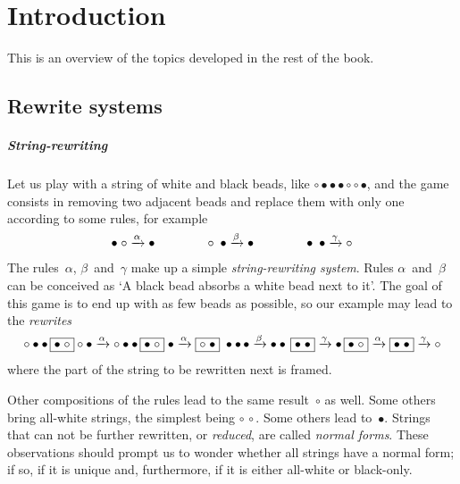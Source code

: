\chapter{Introduction}
\setcounter{page}{1}

This is an overview of the topics developed in the rest of the book.

\section{Rewrite systems}

\paragraph{String-rewriting}

Let us play with a string of white and black beads, like \(\circ
\bullet \bullet \bullet \circ \circ \bullet\), and the game
\citep{VanLeeuwen_1990a,Dershowitz_1993} consists in removing two
adjacent beads and replace them with only one according to some rules,
for example
\begin{equation*}
\bullet \; \circ   \xrightarrow{\smash{\alpha}} \bullet\qquad\qquad
\circ   \; \bullet \xrightarrow{\smash{\beta}} \bullet\qquad\qquad
\bullet \; \bullet \xrightarrow{\smash{\gamma}} \circ
\end{equation*}
The rules~\(\alpha\), \(\beta\)~and~\(\gamma\) make up a simple
\emph{string\hyp{}rewriting system}. Rules
\(\alpha\)~and~\(\beta\) can be conceived as `A black bead absorbs
a white bead next to it'. The goal of this game is to end up with
as few beads as possible, so our example may lead to the
\emph{rewrites}
\begin{equation*}
\circ \bullet \bullet \, \fbox{\(\bullet\; \circ\)} \circ \bullet
\xrightarrow{\smash{\alpha}} \circ \bullet \bullet \,
\fbox{\(\bullet\; \circ\)} \; \bullet \xrightarrow{\smash{\alpha}}
\fbox{\(\circ \; \bullet\)} \; \bullet \bullet \,\bullet
\xrightarrow{\smash{\beta}} \bullet \bullet \, \fbox{\(\bullet \;
  \bullet\)} \xrightarrow{\smash{\gamma}} \bullet \, \fbox{\(\bullet
  \; \circ\)} \xrightarrow{\smash{\alpha}} \fbox{\(\bullet \;
  \bullet\)} \xrightarrow{\smash{\gamma}} \circ
\end{equation*}
where the part of the string to be rewritten next is framed.

Other compositions of the rules lead to the same result~\(\circ\) as
well. Some others bring all\hyp{}white strings, the simplest being
\(\circ \, \circ\). Some others lead to~\(\bullet\). Strings that can
not be further rewritten, or \emph{reduced}, are called \emph{normal
forms}. These observations should
prompt us to wonder whether all strings have a normal form; if so, if
it is unique and, furthermore, if it is either all\hyp{}white or
black\hyp{}only.

